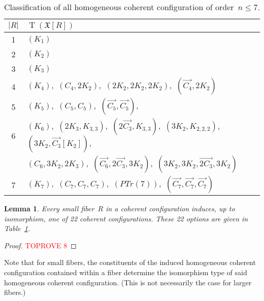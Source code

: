 \documentclass[english,a4paper]{article}
\theoremstyle{plain}
\newtheorem{lemma}      [theorem]{Lemma}
\theoremstyle{definition}
\newcommand{\abs}[1]{| #1 |}
\newcommand{\coherentConfig}{\ensuremath{\mathfrak{X}}}
\newcommand{\inducedCC}[1]{\ensuremath{\coherentConfig[#1]}}
\DeclareMathOperator*{\Type}{T}
\newcommand{\type}[1]{\ensuremath{\Type\left(#1\right)}}
\begin{document}
\begin{table}
    \centering{}\begin{tabular}{|c|l|}
        \hline
        $\abs{R}$ & $\type{\inducedCC{R}}$ \\ \hline
        1 & $(K_1)$\\ \hline
        2 & $(K_2)$\\ \hline
        3 & $(K_3)$\\ \hline
        4 & $(K_4)$,~$(C_4,2K_2)$,~$(2K_2,2K_2,2K_2)$,~$(\overrightarrow{C_4},2K_2)$\\ \hline
        5 & $(K_5)$,~$(C_5,C_5)$,~$(\overrightarrow{C_5},\overrightarrow{C_5})$, \\ \hline
        6 & $(K_6)$,~$(2 K_3,K_{3,3})$,~$(2\overrightarrow{C_3},K_{3,3})$,~$(3 K_2,K_{2,2,2})$,~$(3K_2,\overrightarrow{C_3}[K_2])$,\\
            & $(C_6,3K_2,2K_3)$,~$(\overrightarrow{C_6},2\overrightarrow{C_3},3K_2)$,~$(3K_2,3K_2,\overrightarrow{2C_3},3K_2)$\\ \hline
        7 & $(K_7)$,~$(C_7,C_7,C_7)$,~$(PTr(7))$,~$(\overrightarrow{C_7},\overrightarrow{C_7},\overrightarrow{C_7})$ \\ \hline
    \end{tabular}
    \caption{Classification of all homogeneous coherent configuration of order~$n \leq 7$.}
    \label{small-cc:classificaiton-small-cc/tab}
\end{table}
 

\begin{lemma}
\label{small-cc:induced-cc/lem} \label{small-cc:implied-cc/lem}
    Every small fiber~$R$ in a coherent configuration induces, up to isomorphism, one of 22 coherent configurations. These 22 options are given in Table~\ref{small-cc:classificaiton-small-cc/tab}.
\end{lemma}
\begin{proof}\textcolor{red}{TOPROVE 8}\end{proof}


Note that for small fibers, the constituents of the induced homogeneous coherent configuration contained within a fiber determine the isomorphism type of said homogeneous coherent configuration.
(This is not necessarily the case for larger fibers.)
\end{document}
